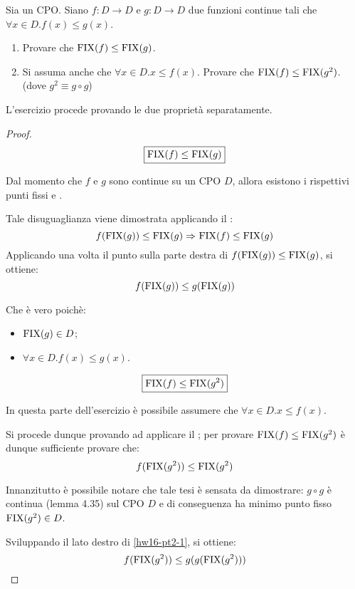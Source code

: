 {
  Sia  un CPO. Siano $f: D \to D$ e $g: D \to D$ due funzioni
  continue tali che $\forall{x}\in D. f(x) \leq{} g(x)$.
  \begin{enumerate}
    \item Provare che $\textrm{\normalfont{FIX}}(f) \leq{} \textrm{\normalfont{FIX}}(g)$.
    \item Si assuma anche che $\forall{x}\in D.x \leq{} f(x)$. Provare che
      $\textrm{\normalfont{FIX}}(f) \leq \textrm{\normalfont{FIX}}(g^2)$. (dove $g^2 \equiv{} g \circ g$)
  \end{enumerate}
}
{}
L'esercizio procede provando le due proprietà separatamente.

\begin{proof}
$$
\boxed{\textrm{\normalfont{FIX}}(f) \leq{} \textrm{\normalfont{FIX}}(g)}
$$

Dal momento che $f$ e $g$ sono continue su un CPO $D$, allora esistono i
rispettivi punti fissi  e .

Tale disuguaglianza viene dimostrata applicando il \FPIL:
\begin{equation}
f(\textrm{\normalfont{FIX}}(g)) \leq \textrm{\normalfont{FIX}}(g)  \Rightarrow^{} \textrm{\normalfont{FIX}}(f) \leq{} \textrm{\normalfont{FIX}}(g)
\label{hw16-x}
\end{equation}
Applicando una volta il punto sulla parte destra di $f(\textrm{\normalfont{FIX}}(g)) \leq \textrm{\normalfont{FIX}}(g)$,
si ottiene:
$$
f(\textrm{\normalfont{FIX}}(g)) \leq g(\textrm{\normalfont{FIX}}(g))
$$

Che è vero poichè:
\begin{itemize}
  \item $\textrm{\normalfont{FIX}}(g) \in D$;
  \item $\forall{x}\in D. f(x) \leq{} g(x)$.
\end{itemize}

$$
\boxed{\textrm{\normalfont{FIX}}(f) \leq \textrm{\normalfont{FIX}}(g^2)}
$$

In questa parte dell'esercizio è possibile assumere che
$\forall{x}\in D.x \leq{} f(x)$.

Si procede dunque provando ad applicare il \FPIL{}; per provare
$\textrm{\normalfont{FIX}}(f) \leq \textrm{\normalfont{FIX}}(g^2)$ è dunque sufficiente provare che:
\begin{equation}
  f(\textrm{\normalfont{FIX}}(g^2)) \leq{} \textrm{\normalfont{FIX}}(g^2)
  \label{hw16-pt2-1}
\end{equation}

Innanzitutto è possibile notare che tale tesi è sensata da dimostrare:
$g \circ g$ è continua (lemma 4.35) sul CPO $D$ e di conseguenza ha minimo
punto fisso $\textrm{\normalfont{FIX}}(g^2)\in D$.

Sviluppando il lato destro di \ref{hw16-pt2-1}, si ottiene:
\begin{equation}
  f(\textrm{\normalfont{FIX}}(g^2)) \leq{} g(g(\textrm{\normalfont{FIX}}(g^2)))
  \label{hw16-pt2-2}
\end{equation}


\end{proof}
